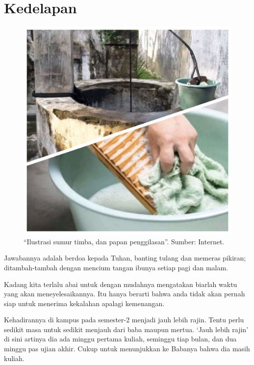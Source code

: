 
\chapter{Kedelapan}

\begin{figure}[htbp]
\centerline{\includegraphics[scale=1.0]{01-08-01}}
\caption{“Ilustrasi sumur timba, dan papan penggilasan”. Sumber: Internet.}
\label{01-08-01}
\end{figure}
%
Jawabannya adalah berdoa kepada Tuhan, banting tulang dan memeras pikiran; ditambah-tambah dengan mencium tangan ibunya setiap pagi dan malam.

Kadang kita terlalu abai untuk dengan mudahnya mengatakan biarlah waktu yang akan meneyelesaikannya. Itu hanya berarti bahwa anda tidak akan pernah siap untuk menerima kekalahan apalagi kemenangan.

Kehadirannya di kampus pada semester-2 menjadi jauh lebih rajin. Tentu perlu sedikit masa untuk sedikit menjauh dari baba maupun mertua. ‘Jauh lebih rajin’ di sini artinya dia ada minggu pertama kuliah, seminggu tiap bulan, dan dua minggu pas ujian akhir. Cukup untuk menunjukkan ke Babanya bahwa dia masih kuliah.

